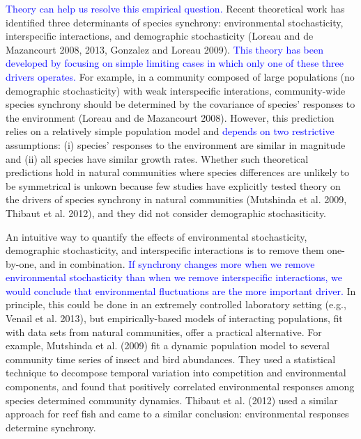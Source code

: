 \documentclass[11pt,]{article}
\begin{document}
\textcolor{blue}{Theory can help us resolve this empirical question.}
Recent theoretical work has identified three determinants of species
synchrony: environmental stochasticity, interspecific interactions, and
demographic stochasticity (Loreau and {{de Mazancourt}} 2008, 2013,
Gonzalez and Loreau 2009).
\textcolor{blue}{This theory has been developed by focusing on simple limiting cases in which only one of these three drivers operates.}
For example, in a community composed of large populations (no
demographic stochasticity) with weak interspecific interations,
community-wide species synchrony should be determined by the covariance
of species' responses to the environment (Loreau and {{de Mazancourt}}
2008). However, this prediction relies on a relatively simple population
model and \textcolor{blue}{depends on two restrictive} assumptions: (i)
species' responses to the environment are similar in magnitude and (ii)
all species have similar growth rates. Whether such theoretical
predictions hold in natural communities where species differences are
unlikely to be symmetrical is unkown because few studies have explicitly
tested theory on the drivers of species synchrony in natural communities
(Mutshinda et al. 2009, Thibaut et al. 2012), and they did not consider
demographic stochasiticity.

An intuitive way to quantify the effects of environmental stochasticity,
demographic stochasticity, and interspecific interactions is to remove
them one-by-one, and in combination.
\textcolor{blue}{If synchrony changes more when we remove environmental stochasticity than when we remove interspecific interactions, we would conclude that environmental fluctuations are the more important driver.}
In principle, this could be done in an extremely controlled laboratory
setting (e.g., Venail et al. 2013), but empirically-based models of
interacting populations, fit with data sets from natural communities,
offer a practical alternative. For example, Mutshinda et al. (2009) fit
a dynamic population model to several community time series of insect
and bird abundances. They used a statistical technique to decompose
temporal variation into competition and environmental components, and
found that positively correlated environmental responses among species
determined community dynamics. Thibaut et al. (2012) used a similar
approach for reef fish and came to a similar conclusion: environmental
responses determine synchrony.
\end{document}
